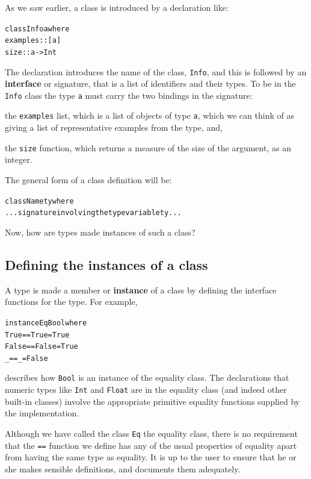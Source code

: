 As we saw earlier, a class is introduced by a declaration like:
\begin{alltt}
class Info a where
  examples :: [a]
  size     :: a -> Int
\end{alltt}
The declaration introduces the name of the class, \texttt{Info}, and this is
followed by an \textbf{interface} or signature, that is a list of identifiers and their types. To be in the \texttt{Info} class the type
\texttt{a} must carry the two bindings in the
signature:
\begin{titemize}
\item the \texttt{examples} list, which is a list of objects of type \texttt{a}, which we can think of as giving a list of representative examples from the type, and,
\item the \texttt{size} function, which returns a measure of the size of the
argument, as an integer.
\end{titemize}
The general form of a class definition will be:
\begin{alltt}
class Name ty where
  ... signature involving the type variable ty ...
\end{alltt}
Now, how are types made instances of such a class?

\subsection*{Defining the instances of a class}

A type is made a member or \textbf{instance} of a class by defining
the interface functions for the type. For example,
\begin{alltt}
instance Eq Bool where
  True  == True  = True
  False == False = True
  _     == _     = False
\end{alltt}
describes how \texttt{Bool} is an instance of the equality class. The
declarations that numeric types like \texttt{Int} and \texttt{Float} are in the
equality class (and indeed other built-in classes) involve the appropriate
primitive
equality functions supplied by the implementation. 

Although we have called the class \texttt{Eq} the equality class, there is
no requirement that the \texttt{==} function we define has any of the usual
properties of equality apart from having the same type as equality. It is up
to the user to ensure that he or she makes sensible definitions, and documents
them adequately.

